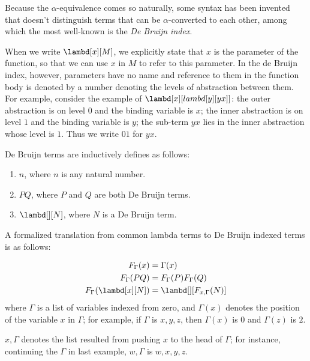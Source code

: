 \documentclass[../../../include/open-logic-section]{subfiles}
\begin{document}


Because the $\alpha$-equivalence comes so naturally, some syntax has
been invented that doesn't distinguish terms that can be
$\alpha$-converted to each other, among which the most well-known is the
\emph{De Bruijn index}.

When we write $\lambd[x][M]$, we explicitly state that $x$ is the
parameter of the function, so that we can use $x$ in $M$ to refer
to this parameter. In the de Bruijn index, however, parameters have no
name and reference to them in the function body is denoted by a number
denoting the levels of abstraction between them. For example, consider
the example of $\lambd[x][lambd[y][y x]]$: the outer  abstraction
is on level $0$ and the binding variable is $x$; the inner abstraction
is on level $1$ and the binding variable is $y$; the sub-term $y x$
lies in the inner abstraction whose level is $1$. Thus we
write $0 1$ for $y x$.

\begin{defn}
  De Bruijn terms are inductively defines as follows:
  \begin{enumerate}
  \item $n$, where $n$ is any natural number.
  \item $PQ$, where $P$ and $Q$ are both De Bruijn terms.
  \item $\lambd[][N]$, where $N$ is a De Bruijn term.
  \end{enumerate}
\end{defn}

A formalized translation from common lambda terms to De Bruijn indexed
terms is as follows:
\begin{defn}
  \begin{align*}
    F_\Gamma(x) &= \Gamma(x) \\
    F_\Gamma(PQ) &= F_\Gamma(P)F_\Gamma(Q) \\
    F_\Gamma(\lambd[x][N]) &= \lambd[][F_{x,\Gamma}(N)]
  \end{align*}
  where $\Gamma$ is a list of variables indexed from zero, and
  $\Gamma(x)$ denotes the position of the variable $x$ in $\Gamma$;
  for example, if $\Gamma$ is $x,y,z$, then $\Gamma(x)$ is $0$ and
  $\Gamma(z)$ is $2$.
  
  $x,\Gamma$ denotes the list resulted from pushing $x$ to the head of
  $\Gamma$; for instance, continuing the $\Gamma$ in last example,
  $w,\Gamma$ is $w,x,y,z$.
\end{defn}
\end{document}
